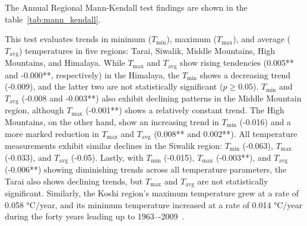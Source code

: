 The Annual Regional Mann-Kendall test findings are shown in the table~\ref{tab:mann_kendall}.

This test evaluates trends in minimum (\(T_{\text{min}}\)), maximum (\(T_{\text{max}}\)), and average (\(T_{\text{avg}}\)) temperatures in five regions: Tarai, Siwalik, Middle Mountains, High Mountains, and Himalaya. While \(T_{\text{max}}\) and \(T_{\text{avg}}\) show rising tendencies (0.005** and -0.000**, respectively) in the Himalaya, the \(T_{\text{min}}\) shows a decreasing trend (-0.009), and the latter two are not statistically significant (\(p \geq 0.05\)). \(T_{\text{min}}\) and \(T_{\text{avg}}\) (-0.008 and -0.003**) also exhibit declining patterns in the Middle Mountain region, although \(T_{\text{max}}\) (-0.001**) shows a relatively constant trend. The High Mountains, on the other hand, show an increasing trend in \(T_{\text{min}}\) (-0.016) and a more marked reduction in \(T_{\text{max}}\) and \(T_{\text{avg}}\) (0.008** and 0.002**). All temperature measurements exhibit similar declines in the Siwalik region: \(T_{\text{min}}\) (-0.063), \(T_{\text{max}}\) (-0.033), and \(T_{\text{avg}}\) (-0.05). Lastly, with \(T_{\text{min}}\) (-0.015), \(T_{\text{max}}\) (-0.003**), and \(T_{\text{avg}}\) (-0.006**) showing diminishing trends across all temperature parameters, the Tarai also shows declining trends, but \(T_{\text{max}}\) and \(T_{\text{avg}}\) are not statistically significant. Similarly, the Koshi region's maximum temperature grew at a rate of 0.058 °C/year, and its minimum temperature increased at a rate of 0.014 °C/year during the forty years leading up to 1963–-2009~\citep{nepal_impacts_2016}.





